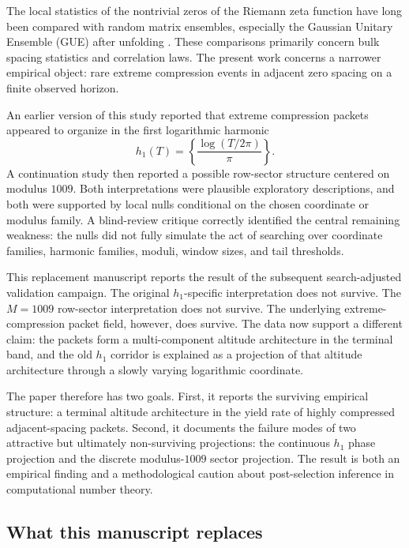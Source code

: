 \documentclass[11pt]{article}
\begin{document}
The local statistics of the nontrivial zeros of the Riemann zeta function have long been compared with random matrix ensembles, especially the Gaussian Unitary Ensemble (GUE) after unfolding \cite{montgomery1973,odlyzko1987,mehta2004}. These comparisons primarily concern bulk spacing statistics and correlation laws. The present work concerns a narrower empirical object: rare extreme compression events in adjacent zero spacing on a finite observed horizon.

An earlier version of this study reported that extreme compression packets appeared to organize in the first logarithmic harmonic
\[
h_1(T)=\left\{\frac{\log(T/2\pi)}{\pi}\right\}.
\]
A continuation study then reported a possible row-sector structure centered on modulus \(1009\). Both interpretations were plausible exploratory descriptions, and both were supported by local nulls conditional on the chosen coordinate or modulus family. A blind-review critique correctly identified the central remaining weakness: the nulls did not fully simulate the act of searching over coordinate families, harmonic families, moduli, window sizes, and tail thresholds.

This replacement manuscript reports the result of the subsequent search-adjusted validation campaign. The original \(h_1\)-specific interpretation does not survive. The \(M=1009\) row-sector interpretation does not survive. The underlying extreme-compression packet field, however, does survive. The data now support a different claim: the packets form a multi-component altitude architecture in the terminal band, and the old \(h_1\) corridor is explained as a projection of that altitude architecture through a slowly varying logarithmic coordinate.

The paper therefore has two goals. First, it reports the surviving empirical structure: a terminal altitude architecture in the yield rate of highly compressed adjacent-spacing packets. Second, it documents the failure modes of two attractive but ultimately non-surviving projections: the continuous \(h_1\) phase projection and the discrete modulus-\(1009\) sector projection. The result is both an empirical finding and a methodological caution about post-selection inference in computational number theory.

\subsection{What this manuscript replaces}
\end{document}
